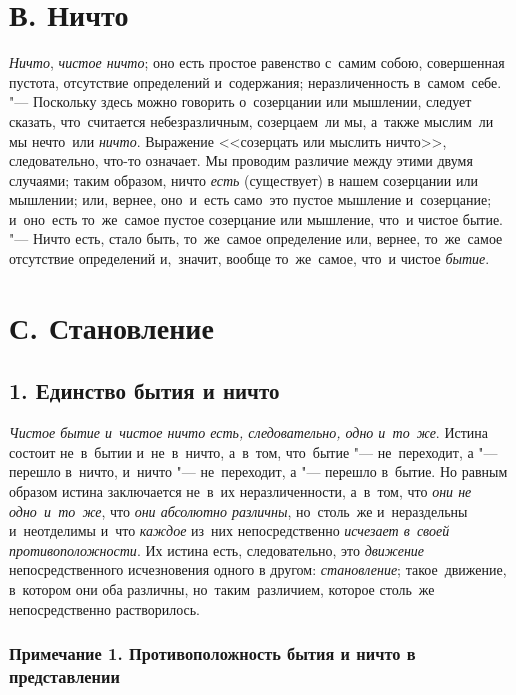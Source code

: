 \section[В. Ничто]{В. Ничто}
{\em Ничто}, {\em чистое ничто}; оно
есть простое равенство с~самим собою, совершенная пустота, отсутствие
определений и~содержания; неразличенность в~самом~себе. "--- Поскольку
здесь можно говорить о~созерцании или мышлении, следует сказать,
что~считается небезразличным, созерцаем~ли мы, а~также мыслим~ли мы
нечто~или {\em ничто}. Выражение <<созерцать или мыслить ничто>>,
следовательно, что-то означает. Мы проводим различие между этими двумя
случаями; таким образом, ничто {\em есть} (существует)
в нашем созерцании или мышлении; или, вернее, оно~и~есть само~это пустое
мышление и~созерцание; и~оно~есть то~же~самое пустое созерцание или
мышление, что~и чистое бытие. "--- Ничто есть, стало быть, то~же~самое
определение или, вернее, то~же~самое отсутствие определений и,~значит,
вообще то~же~самое, что~и чистое {\em бытие}.

\section[С. Становление]{С. Становление}
\subsection[1. Единство бытия и ничто]{1. Единство бытия и ничто}
{\em Чистое бытие и~чистое ничто есть, следовательно, одно и~то~же}.
Истина состоит не~в~бытии и~не~в~ничто, а~в~том, что~бытие "---
не~переходит, а "--- перешло в~ничто, и~ничто "--- не~переходит,
а "--- перешло в~бытие. Но равным образом истина заключается
не~в~их неразличенности, а~в~том, что {\em они не одно~и~то~же}, что
{\em они абсолютно различны}, но~столь~же и~нераздельны
и~неотделимы и~что {\em каждое} из~них непосредственно
{\em исчезает в~своей противоположности}. Их истина
есть, следовательно, это {\em движение}
непосредственного исчезновения одного в другом:
{\em становление}; такое~движение, в~котором они оба
различны, но~таким~различием, которое столь~же непосредственно
растворилось.

\subsubsection[Примечание 1. Противоположность бытия и ничто в представлении]
{Примечание 1. Противоположность бытия и ничто в представлении}


